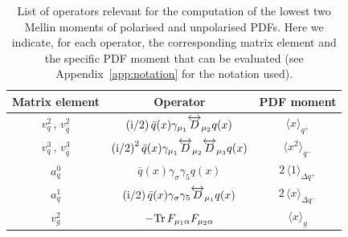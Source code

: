 \begin{table}
\renewcommand{\arraystretch}{1.6} 
\centering
\begin{tabular}{@{}ccc@{}}
\hline 
Matrix element & Operator & PDF moment \\ 
\hline
$v_q^2$\,, $v_{\bar{q}}^2$  & 
$\displaystyle \left({\rm i}/2\right) \bar{q}(x)\gamma_{\mu_1} \overleftrightarrow{D}_{\mu_2} q(x)$ & 
$\langle x \rangle_{q^+}$\\
$v_q^3$\,, $v_{\bar{q}}^3$  & $\displaystyle \left({\rm i}/2\right)^2 \bar{q}(x)\gamma_{\mu_1} \overleftrightarrow{D}_{\mu_2} \overleftrightarrow{D}_{\mu_3} q(x)$ & $\langle x^2 \rangle_{q^-}$\\
$a_q^0$ & $\displaystyle \bar{q}(x)\gamma_{\sigma} \gamma_5 q(x)$ & 
$2\, \langle 1 \rangle_{\Delta q^+}$ \\
$a_q^1$ & $\displaystyle \left({\rm i}/2\right) \bar{q}(x)\gamma_{\sigma} \gamma_5 \overleftrightarrow{D}_{\mu_1} q(x)$ & $2\, \langle x \rangle_{\Delta q^-}$ \\
$v_g^2$ & $\displaystyle - {\rm Tr}\, F_{\mu_1\alpha}F_{\mu_2\alpha}$ & $\langle x \rangle_g$ \\
\hline
\end{tabular}
\caption{\label{Tab:twist2}
\small List of operators relevant for
the computation of the lowest two Mellin moments of polarised and unpolarised PDFs.
%
Here we indicate, for each operator, the corresponding matrix element and
the specific PDF moment that can be evaluated (see
Appendix~\ref{app:notation} for the notation used).
}
\end{table}

